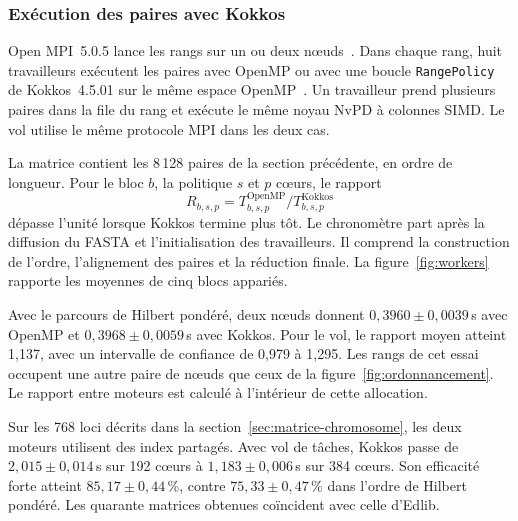 \subsubsection{Exécution des paires avec Kokkos}\label{sec:kokkos-mpi}
Open MPI~5.0.5 lance les rangs sur un ou deux nœuds~\cite{openmpicode}. Dans chaque rang, huit travailleurs exécutent les paires avec OpenMP ou avec une boucle \texttt{RangePolicy} de Kokkos~4.5.01 sur le même espace OpenMP~\cite{kokkos,kokkoscode}. Un travailleur prend plusieurs paires dans la file du rang et exécute le même noyau NvPD à colonnes SIMD. Le vol utilise le même protocole MPI dans les deux cas.

La matrice contient les 8\,128 paires de la section précédente, en ordre de longueur. Pour le bloc \(b\), la politique \(s\) et \(p\) cœurs, le rapport
\[
 R_{b,s,p}=T_{b,s,p}^{\mathrm{OpenMP}}/T_{b,s,p}^{\mathrm{Kokkos}}
\]
dépasse l'unité lorsque Kokkos termine plus tôt. Le chronomètre part après la diffusion du FASTA et l'initialisation des travailleurs. Il comprend la construction de l'ordre, l'alignement des paires et la réduction finale. La figure~\ref{fig:workers} rapporte les moyennes de cinq blocs appariés.

Avec le parcours de Hilbert pondéré, deux nœuds donnent \(0{,}3960\pm0{,}0039\)\,s avec OpenMP et \(0{,}3968\pm0{,}0059\)\,s avec Kokkos. Pour le vol, le rapport moyen atteint 1,137, avec un intervalle de confiance de 0,979 à 1,295. Les rangs de cet essai occupent une autre paire de nœuds que ceux de la figure~\ref{fig:ordonnancement}. Le rapport entre moteurs est calculé à l'intérieur de cette allocation.

Sur les 768 loci décrits dans la section~\ref{sec:matrice-chromosome}, les deux moteurs utilisent des index partagés. Avec vol de tâches, Kokkos passe de \(2{,}015\pm0{,}014\)\,s sur 192 cœurs à \(1{,}183\pm0{,}006\)\,s sur 384 cœurs. Son efficacité forte atteint \(85{,}17\pm0{,}44\)\,\%, contre \(75{,}33\pm0{,}47\)\,\% dans l'ordre de Hilbert pondéré. Les quarante matrices obtenues coïncident avec celle d’Edlib.

\FloatBarrier
{}
